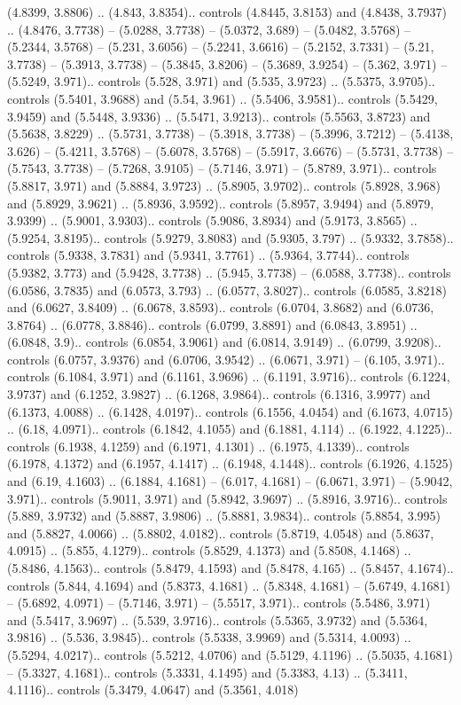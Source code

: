 (4.8399, 3.8806) .. (4.843, 3.8354).. controls (4.8445, 3.8153) and (4.8438, 3.7937) .. (4.8476, 3.7738) -- (5.0288, 3.7738) -- (5.0372, 3.689) -- (5.0482, 3.5768) -- (5.2344, 3.5768) -- (5.231, 3.6056) -- (5.2241, 3.6616) -- (5.2152, 3.7331) -- (5.21, 3.7738) -- (5.3913, 3.7738) -- (5.3845, 3.8206) -- (5.3689, 3.9254) -- (5.362, 3.971) -- (5.5249, 3.971).. controls (5.528, 3.971) and (5.535, 3.9723) .. (5.5375, 3.9705).. controls (5.5401, 3.9688) and (5.54, 3.961) .. (5.5406, 3.9581).. controls (5.5429, 3.9459) and (5.5448, 3.9336) .. (5.5471, 3.9213).. controls (5.5563, 3.8723) and (5.5638, 3.8229) .. (5.5731, 3.7738) -- (5.3918, 3.7738) -- (5.3996, 3.7212) -- (5.4138, 3.626) -- (5.4211, 3.5768) -- (5.6078, 3.5768) -- (5.5917, 3.6676) -- (5.5731, 3.7738) -- (5.7543, 3.7738) -- (5.7268, 3.9105) -- (5.7146, 3.971) -- (5.8789, 3.971).. controls (5.8817, 3.971) and (5.8884, 3.9723) .. (5.8905, 3.9702).. controls (5.8928, 3.968) and (5.8929, 3.9621) .. (5.8936, 3.9592).. controls (5.8957, 3.9494) and (5.8979, 3.9399) .. (5.9001, 3.9303).. controls (5.9086, 3.8934) and (5.9173, 3.8565) .. (5.9254, 3.8195).. controls (5.9279, 3.8083) and (5.9305, 3.797) .. (5.9332, 3.7858).. controls (5.9338, 3.7831) and (5.9341, 3.7761) .. (5.9364, 3.7744).. controls (5.9382, 3.773) and (5.9428, 3.7738) .. (5.945, 3.7738) -- (6.0588, 3.7738).. controls (6.0586, 3.7835) and (6.0573, 3.793) .. (6.0577, 3.8027).. controls (6.0585, 3.8218) and (6.0627, 3.8409) .. (6.0678, 3.8593).. controls (6.0704, 3.8682) and (6.0736, 3.8764) .. (6.0778, 3.8846).. controls (6.0799, 3.8891) and (6.0843, 3.8951) .. (6.0848, 3.9).. controls (6.0854, 3.9061) and (6.0814, 3.9149) .. (6.0799, 3.9208).. controls (6.0757, 3.9376) and (6.0706, 3.9542) .. (6.0671, 3.971) -- (6.105, 3.971).. controls (6.1084, 3.971) and (6.1161, 3.9696) .. (6.1191, 3.9716).. controls (6.1224, 3.9737) and (6.1252, 3.9827) .. (6.1268, 3.9864).. controls (6.1316, 3.9977) and (6.1373, 4.0088) .. (6.1428, 4.0197).. controls (6.1556, 4.0454) and (6.1673, 4.0715) .. (6.18, 4.0971).. controls (6.1842, 4.1055) and (6.1881, 4.114) .. (6.1922, 4.1225).. controls (6.1938, 4.1259) and (6.1971, 4.1301) .. (6.1975, 4.1339).. controls (6.1978, 4.1372) and (6.1957, 4.1417) .. (6.1948, 4.1448).. controls (6.1926, 4.1525) and (6.19, 4.1603) .. (6.1884, 4.1681) -- (6.017, 4.1681) -- (6.0671, 3.971) -- (5.9042, 3.971).. controls (5.9011, 3.971) and (5.8942, 3.9697) .. (5.8916, 3.9716).. controls (5.889, 3.9732) and (5.8887, 3.9806) .. (5.8881, 3.9834).. controls (5.8854, 3.995) and (5.8827, 4.0066) .. (5.8802, 4.0182).. controls (5.8719, 4.0548) and (5.8637, 4.0915) .. (5.855, 4.1279).. controls (5.8529, 4.1373) and (5.8508, 4.1468) .. (5.8486, 4.1563).. controls (5.8479, 4.1593) and (5.8478, 4.165) .. (5.8457, 4.1674).. controls (5.844, 4.1694) and (5.8373, 4.1681) .. (5.8348, 4.1681) -- (5.6749, 4.1681) -- (5.6892, 4.0971) -- (5.7146, 3.971) -- (5.5517, 3.971).. controls (5.5486, 3.971) and (5.5417, 3.9697) .. (5.539, 3.9716).. controls (5.5365, 3.9732) and (5.5364, 3.9816) .. (5.536, 3.9845).. controls (5.5338, 3.9969) and (5.5314, 4.0093) .. (5.5294, 4.0217).. controls (5.5212, 4.0706) and (5.5129, 4.1196) .. (5.5035, 4.1681) -- (5.3327, 4.1681).. controls (5.3331, 4.1495) and (5.3383, 4.13) .. (5.3411, 4.1116).. controls (5.3479, 4.0647) and (5.3561, 4.018) 